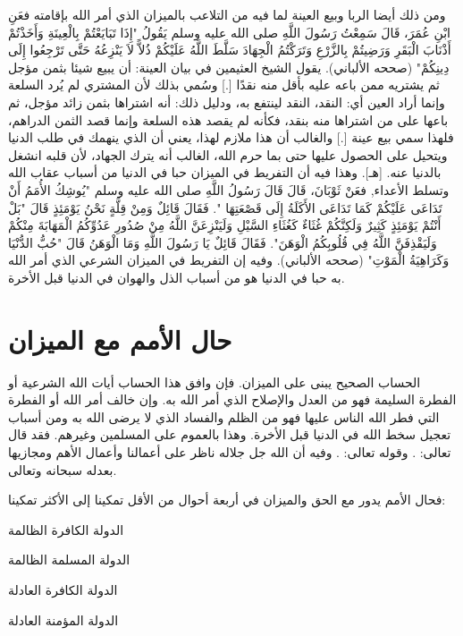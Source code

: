 ومن ذلك أيضا الربا وبيع العينة لما فيه من التلاعب بالميزان الذي أمر الله بإقامته فعَنِ ابْنِ عُمَرَ، قَالَ سَمِعْتُ رَسُولَ اللَّهِ صلى الله عليه وسلم يَقُولُ "إِذَا تَبَايَعْتُمْ بِالْعِينَةِ وَأَخَذْتُمْ أَذْنَابَ الْبَقَرِ وَرَضِيتُمْ بِالزَّرْعِ وَتَرَكْتُمُ الْجِهَادَ سَلَّطَ اللَّهُ عَلَيْكُمْ ذُلاًّ لاَ يَنْزِعُهُ حَتَّى تَرْجِعُوا إِلَى دِينِكُمْ" {\footnotesize (صححه الألباني)}. يقول الشيخ العثيمين في بيان العينة:
أن يبيع شيئا بثمن مؤجل ثم يشتريه ممن باعه عليه بأقل منه نقدًا [.] وسُمي بذلك لأن المشتري لم يُرد السلعة وإنما أراد العين أي: النقد، النقد لينتفع به، ودليل ذلك: أنه اشتراها بثمن زائد مؤجل، ثم باعها على من اشتراها منه بنقد، فكأنه لم يقصد هذه السلعة وإنما قصد الثمن الدراهم، فلهذا سمي بيع عينة [.] والغالب أن هذا ملازم لهذا، يعني أن الذي ينهمك في طلب الدنيا ويتحيل على الحصول عليها حتى بما حرم الله، الغالب أنه يترك الجهاد، لأن قلبه انشغل بالدنيا عنه.
[هـ]. وهذا فيه أن التفريط في الميزان حبا في الدنيا من أسباب عقاب الله وتسلط الأعداء, فعَنْ ثَوْبَانَ، قَالَ قَالَ رَسُولُ اللَّهِ صلى الله عليه وسلم "يُوشِكُ الأُمَمُ أَنْ تَدَاعَى عَلَيْكُمْ كَمَا تَدَاعَى الأَكَلَةُ إِلَى قَصْعَتِهَا ". فَقَالَ قَائِلٌ وَمِنْ قِلَّةٍ نَحْنُ يَوْمَئِذٍ قَالَ "بَلْ أَنْتُمْ يَوْمَئِذٍ كَثِيرٌ وَلَكِنَّكُمْ غُثَاءٌ كَغُثَاءِ السَّيْلِ وَلَيَنْزِعَنَّ اللَّهُ مِنْ صُدُورِ عَدُوِّكُمُ الْمَهَابَةَ مِنْكُمْ وَلَيَقْذِفَنَّ اللَّهُ فِي قُلُوبِكُمُ الْوَهَنَ". فَقَالَ قَائِلٌ يَا رَسُولَ اللَّهِ وَمَا الْوَهَنُ قَالَ "حُبُّ الدُّنْيَا وَكَرَاهِيَةُ الْمَوْتِ" {\footnotesize (صححه الألباني)}. وفيه إن التفريط في الميزان الشرعي الذي أمر الله به حبا في الدنيا هو من أسباب الذل والهوان في الدنيا قبل الأخرة.

\section{حال الأمم مع الميزان}

الحساب الصحيح يبنى على الميزان. فإن وافق هذا الحساب أيات الله الشرعية أو الفطرة السليمة فهو من العدل والإصلاح الذي أمر الله به. وإن خالف أمر الله أو الفطرة التي فطر الله الناس عليها فهو من الظلم والفساد الذي لا يرضى الله به ومن أسباب تعجيل سخط الله في الدنيا قبل الأخرة. وهذا بالعموم على المسلمين وغيرهم. فقد قال تعالى:
\quranayah*[11][117]{\footnotesize \surahname*[11]}.
وقوله تعالى:
\quranayah*[10][13-14]{\footnotesize \surahname*[10]}.
وفيه أن الله جل جلاله ناظر على أعمالنا وأعمال الأهم ومجازيها بعدله سبحانه وتعالى.

فحال الأمم يدور مع الحق والميزان في أربعة أحوال من الأقل تمكينا إلى الأكثر تمكينا:

\begin{compactitem}
    \item الدولة الكافرة الظالمة
    \item الدولة المسلمة الظالمة
    \item الدولة الكافرة العادلة
    \item الدولة المؤمنة العادلة
\end{compactitem}

